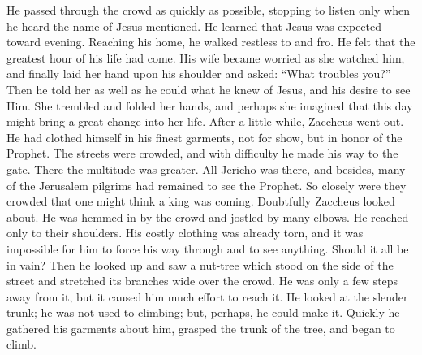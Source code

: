 He passed through the crowd as quickly as possible, stopping to listen only when he heard the name of Jesus mentioned. He learned that Jesus was expected toward evening. Reaching his home, he walked restless to and fro. He felt that the greatest hour of his life had come. His wife became worried as she watched him, and finally laid her hand upon his shoulder and asked: “What troubles you?” Then he told her as well as he could what he knew of Jesus, and his desire to see Him. She trembled and folded her hands, and perhaps she imagined that this day might bring a great change into her life. After a little while, Zaccheus went out. He had clothed himself in his finest garments, not for show, but in honor of the Prophet. The
streets were crowded, and with difficulty he made his way to the gate. There the multitude was greater. All Jericho was there, and besides, many of the Jerusalem pilgrims had remained to see the Prophet. So closely were they crowded that one might think a king was coming. Doubtfully Zaccheus looked about. He was hemmed in by the crowd and jostled by many elbows. He reached only to their shoulders. His costly clothing was already torn, and it was impossible for him to force his way through and to see anything. Should it all be in vain? Then he looked up and saw a nut-tree which stood on the side of the street and stretched its branches wide over the crowd. He was only a few steps away from it, but it caused him much effort to reach it. He looked at the slender trunk; he was not used to climbing; but, perhaps, he could make it. Quickly he gathered his garments about him, grasped the trunk of the tree, and began to climb.

